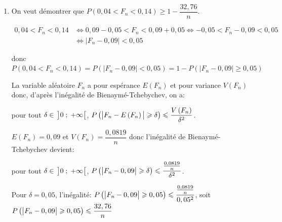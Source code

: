 \begin{enumerate}
\begin{enumerate}

		\item On veut démontrer que $P\left (0,04 < F_n < 0,14\right ) \geqslant 1 - \dfrac{32,76}{n}$.

$\begin{aligned}
0,04 < F_n < 0,14
& \iff 0,09-0,05 < F_n < 0,09+0,05
\iff -0,05 < F_n-0,09 < 0,05\\
& \iff \left | F_n-0,09 \right | < 0,05
\end{aligned}$

donc 
$P\left (0,04 < F_n < 0,14\right ) = P\left (\left | F_n-0,09 \right | < 0,05\right ) = 1-P \left (\left | F_n-0,09 \right |\geqslant 0,05\right ) $

La variable aléatoire $F_n$ a pour espérance $E\left (F_n\right )$ et pour variance $V\left (F_n\right )$ donc, d'après l'inégalité de Bienaymé-Tchebychev, on a:

pour tout $\delta\in\, \left ]0\;;\;+\infty\strut \right [$, 
$P\left (\left |F_n-E\left (F_n\right)\strut \right | \geqslant \delta \right ) \leqslant \dfrac{V\left (F_n\right  )}{\delta^2}$.

$E\left (F_n\right )=0,09$ et $V\left (F_n\right )= \dfrac{0,0819}{n}$ donc  l'inégalité de Bienaymé-Tchebychev devient:

pour tout $\delta\in\, \left ]0\;;\;+\infty\strut \right [$, 
$P\left ( \left |F_n-0,09\strut \right | \geqslant \delta \right ) \leqslant \dfrac{\frac{0,0819}{n}}{\delta^2}$.

Pour $\delta=0,05$, l'inégalité:
$P\left ( \left |F_n-0,09\strut \right | \geqslant 0,05 \right ) \leqslant \dfrac{\frac{0,0819}{n}}{0,05^2}$,
soit
$P\left ( \left |F_n-0,09\strut \right | \geqslant 0,05 \right ) \leqslant \dfrac{32,76}{n}$		
		

\end{enumerate}
\end{enumerate}
